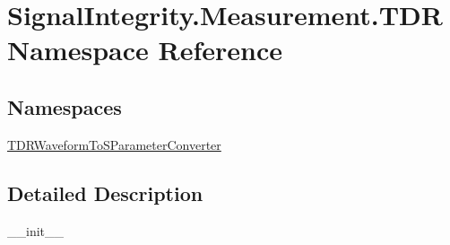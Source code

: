 \hypertarget{namespaceSignalIntegrity_1_1Measurement_1_1TDR}{}\section{Signal\+Integrity.\+Measurement.\+T\+DR Namespace Reference}
\label{namespaceSignalIntegrity_1_1Measurement_1_1TDR}
\subsection*{Namespaces}
\begin{DoxyCompactItemize}
\item 
 \hyperlink{namespaceSignalIntegrity_1_1Measurement_1_1TDR_1_1TDRWaveformToSParameterConverter}{T\+D\+R\+Waveform\+To\+S\+Parameter\+Converter}
\end{DoxyCompactItemize}


\subsection{Detailed Description}
\begin{DoxyVerb}__init__\end{DoxyVerb}
 